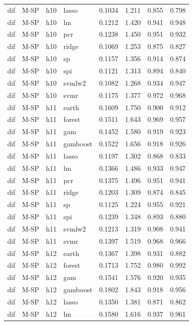 \begin{ThreePartTable}
\begin{longtable}[t]{llclcccc}
dif & M-SP & h10 & lasso & 0.1034 & 1.211 & 0.855 & 0.798\\
dif & M-SP & h10 & lm & 0.1212 & 1.420 & 0.941 & 0.948\\
dif & M-SP & h10 & pcr & 0.1238 & 1.450 & 0.951 & 0.932\\
dif & M-SP & h10 & ridge & 0.1069 & 1.253 & 0.875 & 0.827\\
dif & M-SP & h10 & sp & 0.1157 & 1.356 & 0.914 & 0.874\\
dif & M-SP & h10 & spi & 0.1121 & 1.313 & 0.894 & 0.840\\
dif & M-SP & h10 & svmlw2 & 0.1082 & 1.268 & 0.934 & 0.947\\
dif & M-SP & h10 & svmr & 0.1175 & 1.377 & 0.972 & 0.968\\
\addlinespace
dif & M-SP & h11 & earth & 0.1609 & 1.750 & 0.900 & 0.912\\
dif & M-SP & h11 & forest & 0.1511 & 1.643 & 0.969 & 0.957\\
dif & M-SP & h11 & gam & 0.1452 & 1.580 & 0.919 & 0.923\\
dif & M-SP & h11 & gamboost & 0.1522 & 1.656 & 0.918 & 0.926\\
dif & M-SP & h11 & lasso & 0.1197 & 1.302 & 0.868 & 0.833\\
dif & M-SP & h11 & lm & 0.1366 & 1.486 & 0.933 & 0.947\\
dif & M-SP & h11 & pcr & 0.1375 & 1.496 & 0.951 & 0.941\\
dif & M-SP & h11 & ridge & 0.1203 & 1.309 & 0.874 & 0.845\\
dif & M-SP & h11 & sp & 0.1125 & 1.224 & 0.955 & 0.921\\
dif & M-SP & h11 & spi & 0.1239 & 1.348 & 0.893 & 0.880\\
dif & M-SP & h11 & svmlw2 & 0.1213 & 1.319 & 0.908 & 0.941\\
dif & M-SP & h11 & svmr & 0.1397 & 1.519 & 0.968 & 0.966\\
\addlinespace
dif & M-SP & h12 & earth & 0.1367 & 1.398 & 0.931 & 0.882\\
dif & M-SP & h12 & forest & 0.1713 & 1.752 & 0.980 & 0.992\\
dif & M-SP & h12 & gam & 0.1541 & 1.576 & 0.920 & 0.935\\
dif & M-SP & h12 & gamboost & 0.1802 & 1.843 & 0.918 & 0.956\\
dif & M-SP & h12 & lasso & 0.1350 & 1.381 & 0.871 & 0.862\\
dif & M-SP & h12 & lm & 0.1580 & 1.616 & 0.937 & 0.961\\

\end{longtable}
\end{ThreePartTable}
